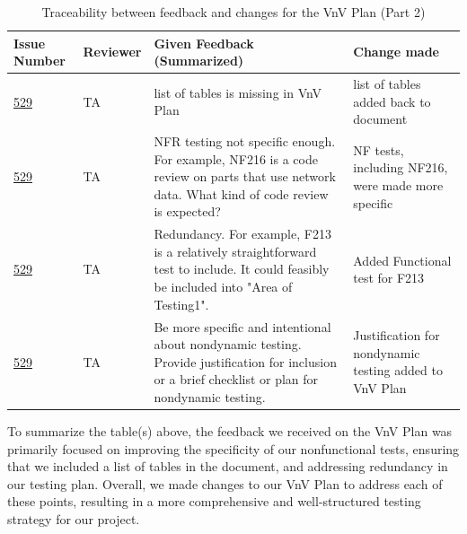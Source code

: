 \documentclass{article}
\begin{document}
\begin{table}[H]
\centering
\begin{tabularx}{\textwidth}{p{1.3cm} l X X}
\toprule
Issue Number & Reviewer & Given Feedback (Summarized) & Change made  \\
\midrule
\href{https://github.com/ritual-17/flow/issues/529}{529} & TA & list of tables is missing in VnV Plan & list of tables added back to document \\
\href{https://github.com/ritual-17/flow/issues/529}{529} & TA & NFR testing not specific enough. For example, NF216 is a code review
 on parts that use network data. What kind of code review is expected? & NF tests,
 including NF216, were made more specific \\
\href{https://github.com/ritual-17/flow/issues/529}{529} & TA & Redundancy. For example, F213 is a relatively straightforward test to include.
It could feasibly be included into "Area of Testing1". & Added Functional test for
F213 \\
\href{https://github.com/ritual-17/flow/issues/529}{529} & TA & Be more specific and intentional about nondynamic testing. Provide
justification for inclusion or a brief checklist or plan for nondynamic testing.
& Justification for nondynamic testing added to VnV Plan \\
\bottomrule
\end{tabularx}
\caption{Traceability between feedback and changes for the VnV Plan (Part 2)}
\end{table}

To summarize the table(s) above, the feedback we received on the VnV Plan was primarily
focused on improving the specificity of our nonfunctional tests, ensuring that we included
a list of tables in the document, and addressing redundancy in our testing plan. Overall,
we made changes to our VnV Plan to address each of these points, resulting in a more
comprehensive and well-structured testing strategy for our project.
\end{document}
